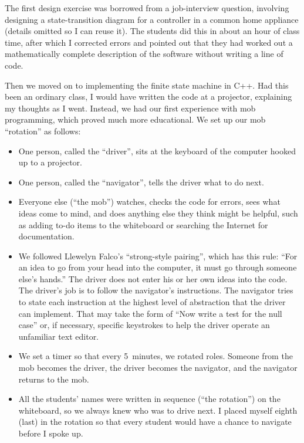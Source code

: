 \documentclass{article}
\begin{document}
The first design exercise was borrowed from a job-interview question,
involving designing a state-transition diagram for a controller in a common
home appliance (details omitted so I can reuse it). The students did this in
about an hour of class time, after which I corrected errors and pointed out
that they had worked out a mathematically complete description of the software
without writing a line of code.

Then we moved on to implementing the finite state machine in C++. Had this
been an ordinary class, I would have written the code at a projector,
explaining my thoughts as I went. Instead, we had our first experience with
mob programming, which proved much more educational. We set up our mob
``rotation'' as follows:

\begin{itemize}
\item One person, called the ``driver'', sits at the keyboard of the computer
hooked up to a projector.

\item One person, called the ``navigator'', tells the driver what to do next.

\item Everyone else (``the mob'') watches, checks the code for errors, sees
what ideas come to mind, and does anything else they think might be helpful,
such as adding to-do items to the whiteboard or searching the Internet for
documentation.

\item We followed Llewelyn Falco's ``strong-style
pairing''\cite{falco2014strong}, which has this rule: ``For an idea to go from
your head into the computer, it must go through someone else's hands.'' The
driver does not enter his or her own ideas into the code. The driver's
job is to follow the navigator's instructions. The navigator tries to state
each instruction at the highest level of abstraction that the driver can
implement. That may take the form of ``Now write a test for the null case''
or, if necessary, specific keystrokes to help the driver operate an unfamiliar
text editor.


\item We set a timer so that every 5~minutes, we rotated roles. Someone from
the mob becomes the driver, the driver becomes the navigator, and the
navigator returns to the mob.

\item All the students' names were written in sequence (``the rotation'')
on the whiteboard, so we always knew who was to drive next. I placed myself
eighth (last) in the rotation so that every student would have a chance to
navigate before I spoke up.
\end{itemize}
\end{document}
